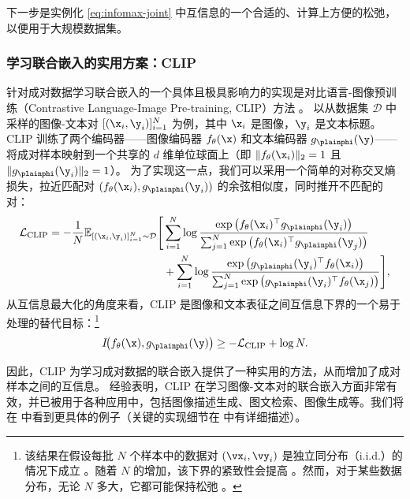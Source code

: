 \documentclass[../../book-main_zh.tex]{subfiles}
\begin{document}
下一步是实例化 \eqref{eq:infomax-joint} 中互信息的一个合适的、计算上方便的松弛，以便用于大规模数据集。
\subsubsection{学习联合嵌入的实用方案：CLIP}

针对成对数据学习联合嵌入的一个具体且极具影响力的实现是对比语言-图像预训练（Contrastive Language-Image Pre-training, CLIP）方法 \cite{radford2021learning}。
以从数据集 $\mathcal{D}$ 中采样的图像-文本对 $[(\x_i, \y_i)]_{i=1}^N$ 为例，其中 $\x_i$ 是图像，$\y_i$ 是文本标题。
CLIP 训练了两个编码器——图像编码器 $f_{\theta}(\x)$ 和文本编码器 $g_{\plainphi}(\y)$——将成对样本映射到一个共享的 $d$ 维单位球面上（即 $\|f_{\theta}(\x_i)\|_2 = 1$ 且 $\|g_{\plainphi}(\y_i)\|_2 = 1$）。
为了实现这一点，我们可以采用一个简单的对称交叉熵损失，拉近匹配对 $(f_{\theta}(\x_i),g_{\plainphi}(\y_i))$ 的余弦相似度，同时推开不匹配的对：
\begin{align}
    \mathcal{L}_{\mathrm{CLIP}} = -\frac{1}{N}\mathbb{E}_{[(\x_i,
        \y_i)]_{i=1}^N \sim
    \mathcal{D}} \Biggr[  &\sum_{i=1}^N\log \frac{\exp\left(
                f_{\theta}(\x_i)^\top g_{\plainphi}(\y_i)
        \right)}{\sum_{j=1}^N \exp\left( f_{\theta}(\x_i)^\top
        g_{\plainphi}(\y_j) \right)} \nonumber \\
        &+\sum_{i=1}^N\log \frac{\exp\left( g_{\plainphi}(\y_i)^\top
        f_{\theta}(\x_i) \right)}{\sum_{j=1}^N \exp\left(
    g_{\plainphi}(\y_i)^\top f_{\theta}(\x_j) \right)} \Biggr],
    \label{eq:clip-loss}
\end{align}
从互信息最大化的角度来看，CLIP 是图像和文本表征之间互信息下界的一个易于处理的替代目标：\footnote{该结果在假设每批 $N$ 个样本中的数据对 $(\vx_i, \vy_i)$ 是独立同分布（i.i.d.）的情况下成立 \cite[Lemma 1]{Oko2025-wk}。随着 $N$ 的增加，该下界的紧致性会提高 \cite{Van_den_Oord2018-qf}。然而，对于某些数据分布，无论 $N$ 多大，它都可能保持松弛 \cite{mcallester2019formal,10.5555/3524938.3525859}。}
\begin{equation}
    I\!\big(f_{\theta}(\x),g_{\plainphi}(\y)\big) \geq -
    \mathcal{L}_{\mathrm{CLIP}} + \log N.
\end{equation}

因此，CLIP 为学习成对数据的联合嵌入提供了一种实用的方法，从而增加了成对样本之间的互信息。
经验表明，CLIP 在学习图像-文本对的联合嵌入方面非常有效，并已被用于各种应用中，包括图像描述生成、图文检索、图像生成等。我们将在  中看到更具体的例子（关键的实现细节在  中有详细描述）。
\end{document}
